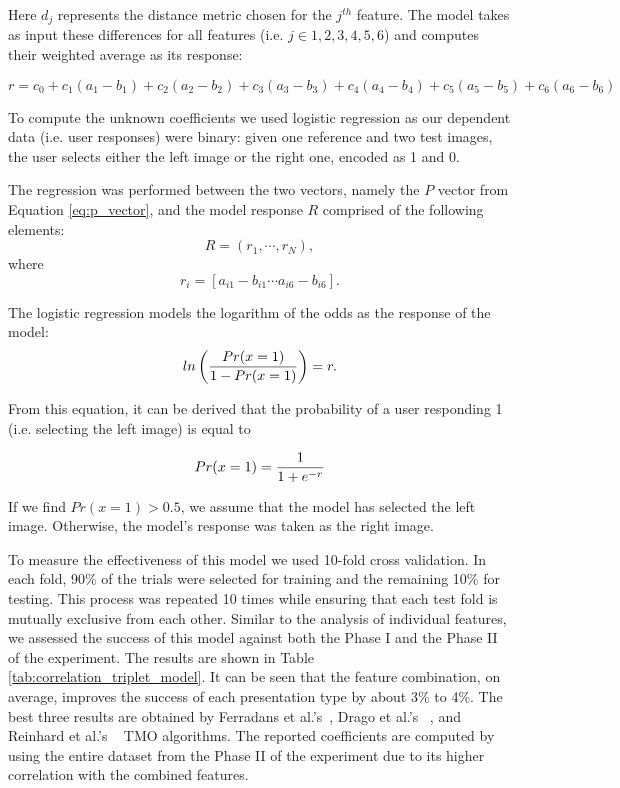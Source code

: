 Here $d_j$ represents the distance metric chosen for the $j^{th}$ feature. The model takes as input these differences for all features (i.e. $j \in {1, 2, 3, 4, 5, 6}$) and computes their weighted average as its response:

\begin{equation}
    r = c_0 + c_1(a_1 - b_1) + c_2(a_2 - b_2) + c_3(a_3 - b_3)+ c_4(a_4 - b_4) + c_5(a_5 - b_5) + c_6(a_6 - b_6)
\end{equation}
 

To compute the unknown coefficients we used logistic regression as our dependent data (i.e. user responses)
were binary: given one reference and two test images, the user selects either the left image or the right one,
encoded as 1 and 0.

The regression was performed between the two vectors, namely the $P$ vector from Equation \ref{eq:p_vector}, and the model response $R$ comprised of the following elements:
\begin{equation}
    R = (r_1,\cdots, r_N ),
\end{equation}
where
\begin{equation}
    r_i = [a_{i1} - b_{i1} \cdots a_{i6} - b_{i6}].
\end{equation}

The logistic regression models the logarithm of the odds as the response of the model:
\begin{equation}
   ln \left( {{Pr(x = 1)} \over { 1 - Pr(x = 1)}} \right) = r. 
\end{equation}


From this equation, it can be derived that the probability of a user responding 1 (i.e. selecting the left image)
is equal to

\begin{equation}
\label{eq:response_prob}
    Pr(x = 1) = {{1} \over {1 + e^{-r}}}
\end{equation}

If we find $Pr(x = 1) > 0.5$, we assume that the model has selected the left image. Otherwise, the model’s response was taken as the right image.

To measure the effectiveness of this model we used 10-fold cross validation. In each fold, 90\% of the trials
were selected for training and the remaining 10\% for testing. This process was repeated 10 times while ensuring that each test fold is mutually exclusive from each other. Similar to the analysis of individual features, we assessed the success of this model against both the Phase I and the Phase II of the experiment. The results are shown in Table \ref{tab:correlation_triplet_model}. It can be seen that the feature combination, on average, improves the success of each presentation type by about 3\% to 4\%. The best three results are obtained by Ferradans et al.’s~\cite{ferradans2011analysis}, Drago et al.’s ~\cite{drago2003adaptive}, and Reinhard et al.’s ~\cite{reinhard2002photographic} TMO algorithms. The reported coefficients are computed by using the entire dataset from the Phase II of the experiment due to its higher correlation with the combined features.

